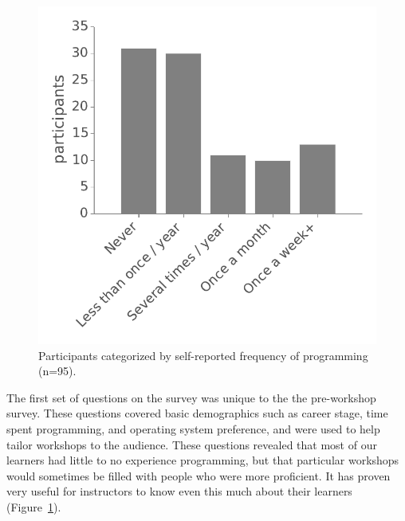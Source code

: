 \documentclass[10pt, twocolumn]{article}
\begin{document}
\begin{figure}[!b]
\includegraphics[width=\linewidth]{figures/ProgrammingFrequency}
\caption{Participants categorized by self-reported frequency of programming (n=95).\label{frequency}}

\end{figure}

The first set of questions on the survey was unique to the the pre-workshop survey.
These questions covered basic demographics such as career stage,
time spent programming,
and operating system preference,
and were used to help tailor workshops to the audience.
These questions revealed that most of our learners had little to no experience programming,
but that particular workshops would sometimes be filled with people who were more proficient.
It has proven very useful for instructors to know even this much about their learners (Figure~\ref{frequency}).

\end{document}

